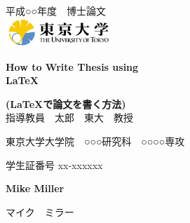 \documentclass[12pt, a4paper, twoside, openright,dvipdfmx]{report}		%
\begin{document}
\begin{titlepage}

\thisfancypage{%
	\setlength{\fboxrule}{1pt}
	\doublebox}{}
\begin{center}

\null
\vspace{1cm}
{\large 平成○○年度　博士論文}\\
\vspace{0.5cm}
\includegraphics[width=0.3\textwidth]{logo_todai.png}

\vspace{2cm}
{\Huge\bf How to Write Thesis using\\
\LaTeX
}

\vspace{1cm}
{\Huge\bf (\LaTeX で論文を書く方法)}
\\
\vfill
{\large 指導教員　太郎　東大　教授}

\vspace{2.5cm}
東京大学大学院　○○○研究科　○○○○専攻

\vspace{0.2cm}
学生証番号 xx-xxxxxx

\vspace{0.5cm}
{\Large\bf Mike Miller}

\vspace{0.5cm}
{\Large マイク　ミラー}

\vspace{2.0cm}
\end{center}
\end{titlepage}

\cleardoublepage
{}
\pagestyle{plain}


\newpage


\newpage

\dominitoc
\tableofcontents
\newpage

\listoffigures \mtcaddchapter
\newpage

\listoftables \mtcaddchapter
\cleardoublepage

\setcounter{chapter}{0}
\setcounter{section}{0}
\def\thechapter{\arabic{chapter}}
\pagestyle{fancy}
\fancyhf{}
\fancyhead[LE]{\small\emph{\leftmark}}			%
\fancyhead[RO]{\small\emph{\rightmark}}			%
\fancyfoot[CE,CO]{\thepage}						%

\setcounter{mtc}{5}								%


\newpage

\cleardoublepage
\def\thechapter{}
\def\@chapapp{}

\cleardoublepage


\end{document}
